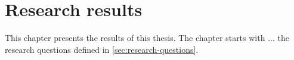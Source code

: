 \chapter{Research results}
\label{chap:results}
This chapter presents the results of this thesis. The chapter starts with ... the research questions defined in \cref{sec:research-questions}.